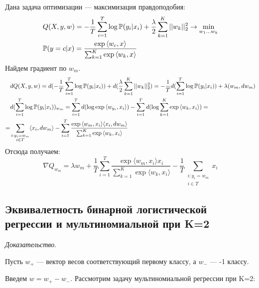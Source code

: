 \documentclass[12pt,fleqn]{article}
\begin{document}
Дана задача оптимизации --- максимизация правдоподобия:
\begin{align}
    \notag & Q(X,y,w) = -\frac{1}{T}\sum_{i=1}^{T}\log\mathbb{P}(y_i|x_i)+
    \frac{\lambda}{2}\sum_{k=1}^{K}||w_k||_2^2 \rightarrow \min_{w_1\dots w_k} \\
    \notag & \mathbb{P}(y=c|x) = \frac{\exp{\langle w_c,x \rangle}}{\sum_{k=1}^{K}\exp{\langle w_k,x \rangle}}
\end{align}
Найдем градиент по $w_m$.
\begin{align}
    \notag & dQ(X,y,w) = d(-\frac{1}{T}\sum_{i=1}^{T}\log\mathbb{P}(y_i|x_i)) + d(\frac{\lambda}{2}\sum_{k=1}^{K}||w_k||_2^2) =
    -\frac{1}{T}d(\sum_{i=1}^{T}\log\mathbb{P}(y_i|x_i)) + \lambda(w_m,dw_m) \\
    \notag & d(\sum_{i=1}^{T}\log\mathbb{P}(y_i|x_i))_{w_m} = \sum_{i=1}^{T}d(\log\exp{\langle w_{y_i}, x_i \rangle})-
    \sum_{i=1}^{T}d(\log \sum_{k=1}^{K}\exp{\langle w_k, x_i \rangle}) = \\
    \notag =&\sum_{\substack{i:y_i=w_m \\ i\in T}}\langle x_i,dw_m \rangle - 
    \sum_{i=1}^{T}\frac{\exp{\langle w_m,x_i\rangle}\langle x_i,dw_m \rangle}{\sum_{k=1}^{K}\exp{\langle w_k, x_i \rangle}}
\end{align}
Отсюда получаем: 
$$
\nabla Q_{w_m} =\lambda w_m + \frac{1}{T}\sum_{i=1}^{T}
\frac{\exp{\langle w_m,x_i\rangle}x_i}{\sum_{k=1}^{K}\exp{\langle w_k, x_i \rangle}}-
\frac{1}{T}\sum_{\substack{i:y_i=w_m \\ i\in T}}x_i 
$$
\subsection{Эквивалетность бинарной логистической регрессии и мультиномиальной при K=2}
\noindent \textit{Доказательство}.

\noindent Пусть $w_{+}$ --- вектор весов соответствующий первому классу, а $w_{-}$ --- -1 классу.

\noindent Введем $w = w_{+}-w_{-}$.
\noindent Рассмотрим задачу мультиномиальной регрессии при K=2:
\end{document}
